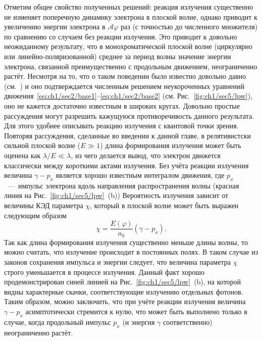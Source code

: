 Отметим общее свойство полученных решений: реакция излучения существенно не изменяет поперечную динамику электрона в плоской волне, однако приводит к увеличению энергии электрона в $\mathcal{A}\varphi$ раз (с точностью до численного множителя) по сравнению со случаем без реакции излучения.
Это приводит к довольно неожиданному результату, что в монохроматической плоской волне (циркулярно или линейно-поляризованной) среднее за период волны значение энергии электрона, связанной преимущественно с продольным движением,  неограниченно растёт.
Несмотря на то, что о таком поведении было известно довольно давно (см.~\cite{Zeldovich75, di2008exact,gunn1971motion, grewing1973acceleration, thielheim1993particle,ekman2021exact}) и оно подтверждается численным решением неукороченных уравнений движения~\eqref{eq:ch1/sec2/base1}--\eqref{eq:ch1/sec2/base2} (см. Рис.~\ref{fig:ch1/sec5/lpw}), оно не кажется достаточно известным в широких кругах.
Довольно простые рассуждения могут разрешить кажущуюся противоречивость данного результата.
Для этого удобнее описывать реакцию излучения с квантовой точки зрения.
Повторяя рассуждения, сделанные во введении к данной главе, в релятивистски сильной плоской волне ($E \gg 1$) длина формирования излучения может быть оценена как $\lambda/E \ll \lambda$, из чего делается вывод, что электрон движется классически между короткими актами излучения.
Без учёта реакции излучения величина $\gamma - p_x$ является хорошо известным интегралом движения, где $p_x$~---~импульс электрона вдоль направления распространения волны (красная линия на Рис.~\ref{fig:ch1/sec5/lpw}~(b)) 
Вероятность излучения зависит от величины КЭД параметра $\chi$, который в плоской волне может быть выражен следующим образом
\begin{equation}
    \chi = \frac{E(\varphi)}{a_\mathrm{S}} \left( \gamma - p_x \right) .
\end{equation}
Так как длина формирования излучения существенно меньше длины волны, то можно считать, что излучение происходит в постоянных полях.
В таком случае из законов сохранения импульса и энергии следует, что величина параметра $\chi$ строго уменьшается в процессе излучения.
Данный факт хорошо продемонстрирован синей линией на Рис.~\ref{fig:ch1/sec5/lpw}~(b), на которой видны характерные скачки, соответствующие излучению отдельных фотонов.
Таким образом, можно заключить, что при учёте реакции излучения величина $\gamma - p_x$ асимптотически стремится к нулю, что может быть выполнено только в случае, когда продольный импульс $p_x$ (и энергия $\gamma$ соответственно) неограниченно растёт.

